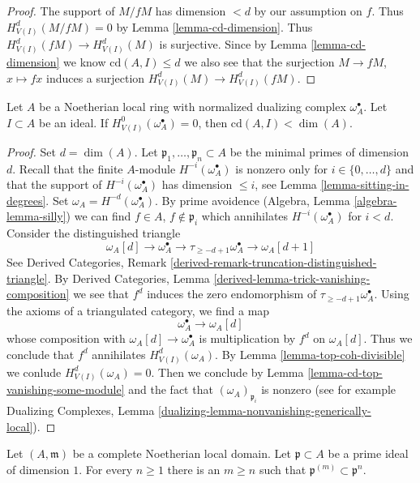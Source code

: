 \begin{proof}
The support of $M/fM$ has dimension $< d$ by our assumption on $f$.
Thus $H^d_{V(I)}(M/fM) = 0$ by Lemma \ref{lemma-cd-dimension}.
Thus $H^d_{V(I)}(fM) \to H^d_{V(I)}(M)$ is surjective.
Since by Lemma \ref{lemma-cd-dimension} we know $\text{cd}(A, I) \leq d$
we also see that the surjection $M \to fM$, $x \mapsto fx$
induces a surjection $H^d_{V(I)}(M) \to H^d_{V(I)}(fM)$.
\end{proof}

\begin{lemma}
\label{lemma-cd-bound-dualizing}
Let $A$ be a Noetherian local ring with
normalized dualizing complex $\omega_A^\bullet$.
Let $I \subset A$ be an ideal.
If $H^0_{V(I)}(\omega_A^\bullet) = 0$, then $\text{cd}(A, I) < \dim(A)$.
\end{lemma}

\begin{proof}
Set $d = \dim(A)$. Let $\mathfrak p_1, \ldots, \mathfrak p_n \subset A$
be the minimal primes of dimension $d$.
Recall that the finite $A$-module
$H^{-i}(\omega_A^\bullet)$ is nonzero only for
$i \in \{0, \ldots, d\}$ and that the support
of $H^{-i}(\omega_A^\bullet)$ has dimension $\leq i$, see
Lemma \ref{lemma-sitting-in-degrees}.
Set $\omega_A = H^{-d}(\omega_A^\bullet)$.
By prime avoidence (Algebra, Lemma \ref{algebra-lemma-silly})
we can find $f \in A$, $f \not \in \mathfrak p_i$
which annihilates $H^{-i}(\omega_A^\bullet)$ for $i < d$.
Consider the distinguished triangle
$$
\omega_A[d] \to \omega_A^\bullet \to
\tau_{\geq -d + 1}\omega_A^\bullet \to \omega_A[d + 1]
$$
See Derived Categories, Remark
\ref{derived-remark-truncation-distinguished-triangle}.
By Derived Categories, Lemma \ref{derived-lemma-trick-vanishing-composition}
we see that $f^d$ induces the zero endomorphism of
$\tau_{\geq -d + 1}\omega_A^\bullet$.
Using the axioms of a triangulated category, we find a map
$$
\omega_A^\bullet \to \omega_A[d]
$$
whose composition with $\omega_A[d] \to \omega_A^\bullet$ is
multiplication by $f^d$ on $\omega_A[d]$.
Thus we conclude that $f^d$ annihilates $H^d_{V(I)}(\omega_A)$.
By Lemma \ref{lemma-top-coh-divisible} we conlude $H^d_{V(I)}(\omega_A) = 0$.
Then we conclude by Lemma \ref{lemma-cd-top-vanishing-some-module}
and the fact that $(\omega_A)_{\mathfrak p_i}$ is nonzero
(see for example
Dualizing Complexes, Lemma
\ref{dualizing-lemma-nonvanishing-generically-local}).
\end{proof}

\begin{lemma}
\label{lemma-inverse-system-symbolic-powers}
Let $(A, \mathfrak m)$ be a complete Noetherian local domain. Let
$\mathfrak p \subset A$ be a prime ideal of dimension $1$.
For every $n \geq 1$ there is an $m \geq n$ such that
$\mathfrak p^{(m)} \subset \mathfrak p^n$.
\end{lemma}


